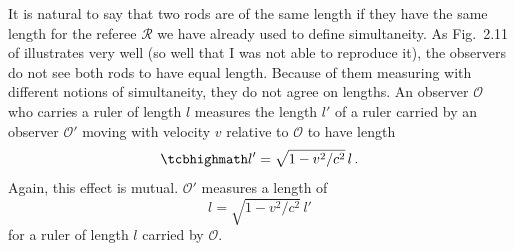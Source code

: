 \documentclass[../relativity_main.tex]{subfiles}
\begin{document}
It is natural to say that two rods are of the same length if they have the same length for the referee $\mathcal{R}$ we have already used to define simultaneity. As Fig.~2.11 of \cite{dragon_geometry_srt} illustrates very well (so well that I was not able to reproduce it), the observers do not see both rods to have equal length. Because of them measuring with different notions of simultaneity, they do not agree on lengths. An observer $\mathcal{O}$ who carries a ruler of length $l$ measures the length $l'$ of a ruler carried by an observer $\mathcal{O}'$ moving with velocity $v$ relative to $\mathcal{O}$ to have length
\begin{equation}\label{eq:length_contraction}
	\eqbox{
	l' = \sqrt{1 - v^2 / c^2} \, l
	} \, .
\end{equation}
Again, this effect is mutual. $\mathcal{O}'$ measures a length of
\begin{equation*}
	l = \sqrt{1 - v^2 / c^2} \, l'
\end{equation*}
for a ruler of length $l$ carried by $\mathcal{O}$.



\end{document}
